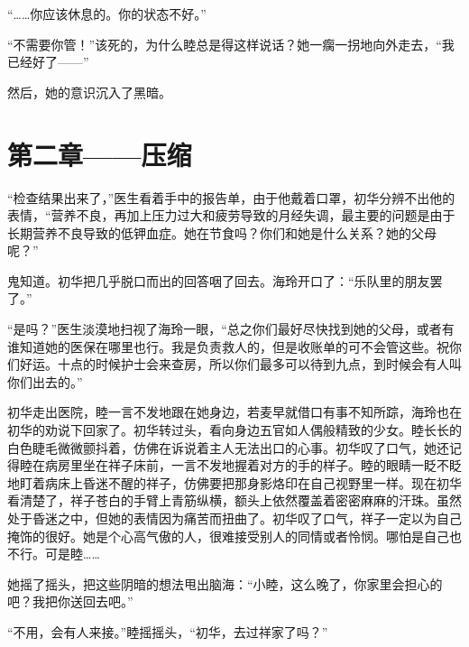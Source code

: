 \documentclass{article}
\begin{document}
“……你应该休息的。你的状态不好。”



“不需要你管！”该死的，为什么睦总是得这样说话？她一瘸一拐地向外走去，“我已经好了——”



然后，她的意识沉入了黑暗。



\newpage





{\centering\section*{第二章——压缩}}





“检查结果出来了，”医生看着手中的报告单，由于他戴着口罩，初华分辨不出他的表情，“营养不良，再加上压力过大和疲劳导致的月经失调，最主要的问题是由于长期营养不良导致的低钾血症。她在节食吗？你们和她是什么关系？她的父母呢？”



鬼知道。初华把几乎脱口而出的回答咽了回去。海玲开口了：“乐队里的朋友罢了。”



“是吗？”医生淡漠地扫视了海玲一眼，“总之你们最好尽快找到她的父母，或者有谁知道她的医保在哪里也行。我是负责救人的，但是收账单的可不会管这些。祝你们好运。十点的时候护士会来查房，所以你们最多可以待到九点，到时候会有人叫你们出去的。”



初华走出医院，睦一言不发地跟在她身边，若麦早就借口有事不知所踪，海玲也在初华的劝说下回家了。初华转过头，看向身边五官如人偶般精致的少女。睦长长的白色睫毛微微颤抖着，仿佛在诉说着主人无法出口的心事。初华叹了口气，她还记得睦在病房里坐在祥子床前，一言不发地握着对方的手的样子。睦的眼睛一眨不眨地盯着病床上昏迷不醒的祥子，仿佛要把那身影烙印在自己视野里一样。现在初华看清楚了，祥子苍白的手臂上青筋纵横，额头上依然覆盖着密密麻麻的汗珠。虽然处于昏迷之中，但她的表情因为痛苦而扭曲了。初华叹了口气，祥子一定以为自己掩饰的很好。她是个心高气傲的人，很难接受别人的同情或者怜悯。哪怕是自己也不行。可是睦……



她摇了摇头，把这些阴暗的想法甩出脑海：“小睦，这么晚了，你家里会担心的吧？我把你送回去吧。”



“不用，会有人来接。”睦摇摇头，“初华，去过祥家了吗？”
\end{document}
